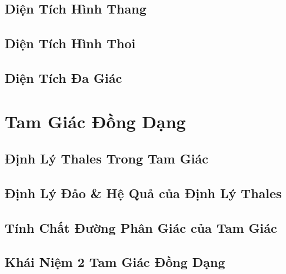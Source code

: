 \documentclass{article}
\numberwithin{equation}{section}
\begin{document}

\subsection{Diện Tích Hình Thang}


\subsection{Diện Tích Hình Thoi}


\subsection{Diện Tích Đa Giác}


\section{Tam Giác Đồng Dạng}

\subsection{Định Lý Thales Trong Tam Giác}


\subsection{Định Lý Đảo \& Hệ Quả của Định Lý Thales}


\subsection{Tính Chất Đường Phân Giác của Tam Giác}


\subsection{Khái Niệm 2 Tam Giác Đồng Dạng}
\end{document}
